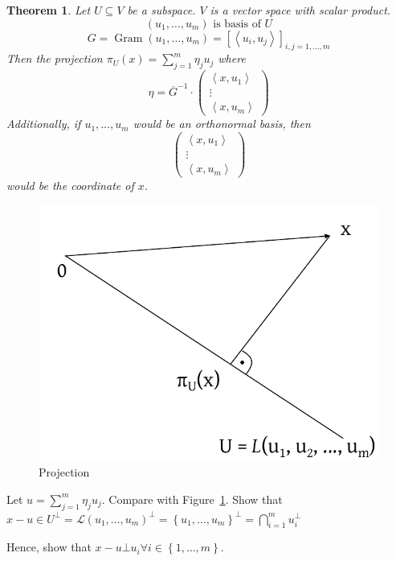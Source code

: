 \documentclass{article}
\newcounter{lecref}[section]
\numberwithin{lecref}{section}
\newtheorem{theorem}[lecref]{Theorem}
\newcommand{\set}[1]{\left\{#1\right\}}
\newcommand{\ip}[2]{\left\langle#1,#2\right\rangle} %
\begin{document}
\begin{theorem} %
  Let $U \subseteq V$ be a subspace. $V$ is a vector space with scalar product.
  \[ (u_1, \ldots, u_m) \text{ is basis of } U \]
  \[ G = \operatorname{Gram}(u_1, \ldots, u_m) = \left[\ip{u_i}{u_j}\right]_{i,j=1,\ldots,m} \]
  Then the projection $\pi_U(x) = \sum_{j=1}^m \eta_j u_j$ where
  \[ \eta = \overline{G}^{-1} \cdot \begin{pmatrix} \ip{x}{u_1} \\ \vdots \\ \ip{x}{u_m} \end{pmatrix} \]
  Additionally, if $u_1, \ldots, u_m$ would be an orthonormal basis, then
  \[ \begin{pmatrix} \ip{x}{u_1} \\ \vdots \\ \ip{x}{u_m} \end{pmatrix} \]
  would be the coordinate of $x$.
\end{theorem}

\begin{figure}[t]
  \begin{center}
    \includegraphics{img/11_projection.pdf}
    \caption{Projection}
    \label{img:projection}
  \end{center}
\end{figure}

Let $u = \sum_{j=1}^m \eta_j u_j$. Compare with Figure~\ref{img:projection}.
Show that $x - u \in U^{\bot} = \mathcal L(u_1, \ldots, u_m)^\bot = \set{u_1, \ldots, u_m}^\bot = \bigcap_{i=1}^m u_i^\bot$

Hence, show that $x - u \bot u_i \forall i \in \set{1, \ldots, m}$.
\end{document}
